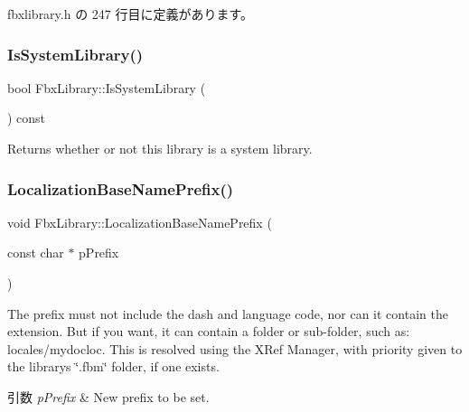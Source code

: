  fbxlibrary.\+h の 247 行目に定義があります。

\mbox{\label{class_fbx_library_ad0e5e2ea87d5a993ed5a70a27671f9ac}} 
\subsubsection{\texorpdfstring{Is\+System\+Library()}{IsSystemLibrary()}}
{\footnotesize\ttfamily bool Fbx\+Library\+::\+Is\+System\+Library (\begin{DoxyParamCaption}{ }\end{DoxyParamCaption}) const}



Returns whether or not this library is a system library. 

\mbox{\label{class_fbx_library_a31ee4d35fbd0ae97fdb0470a487ae5ff}} 
\subsubsection{\texorpdfstring{Localization\+Base\+Name\+Prefix()}{LocalizationBaseNamePrefix()}\hspace{0.1cm}{\footnotesize\ttfamily [1/2]}}
{\footnotesize\ttfamily void Fbx\+Library\+::\+Localization\+Base\+Name\+Prefix (\begin{DoxyParamCaption}\item[{const char $\ast$}]{p\+Prefix }\end{DoxyParamCaption})}

The prefix must not include the dash and language code, nor can it contain the extension. But if you want, it can contain a folder or sub-\/folder, such as\+: locales/mydocloc. This is resolved using the X\+Ref Manager, with priority given to the library\textquotesingle{}s \char`\"{}.\+fbm\char`\"{} folder, if one exists. 
\begin{DoxyParams}{引数}
{\em p\+Prefix} & New prefix to be set. \\
\hline
\end{DoxyParams}
\mbox{\label{class_fbx_library_acfd1439811766c38c8b3fce758787603}} 
